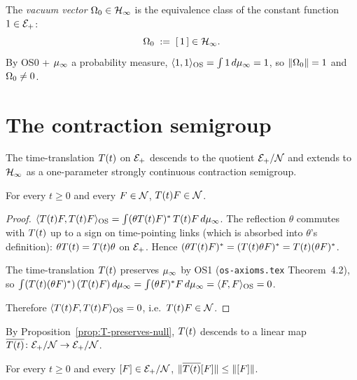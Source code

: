 \begin{definition}
\label{def:vacuum}
The \emph{vacuum vector} $\Omega_0 \in \mathcal{H}_\infty$ is the equivalence
class of the constant function $1 \in \mathcal{E}_+$:
\begin{equation*}
  \Omega_0 \;:=\; [\,1\,] \in \mathcal{H}_\infty.
\end{equation*}
By OS0 + $\mu_\infty$ a probability measure,
$\langle 1, 1 \rangle_{\mathrm{OS}} = \int 1 \, d\mu_\infty = 1$, so $\|\Omega_0\| = 1$ and
$\Omega_0 \ne 0$.
\end{definition}

\section{The contraction semigroup}
\label{sec:semigroup}

The time-translation $T(t)$ on $\mathcal{E}_+$ descends to the quotient
$\mathcal{E}_+ / \mathcal{N}$ and extends to $\mathcal{H}_\infty$ as a one-parameter
strongly continuous contraction semigroup.

\begin{proposition}
\label{prop:T-preserves-null}
For every $t \ge 0$ and every $F \in \mathcal{N}$, $T(t) F \in \mathcal{N}$.
\end{proposition}

\begin{proof}
$\langle T(t) F, T(t) F \rangle_{\mathrm{OS}} = \int (\theta T(t) F)^* \, T(t) F \, d\mu_\infty$.
The reflection $\theta$ commutes with $T(t)$ up to a sign on
time-pointing links (which is absorbed into $\theta$'s definition):
$\theta T(t) = T(t) \theta$ on $\mathcal{E}_+$.  Hence
$(\theta T(t) F)^* = (T(t) \theta F)^* = T(t) (\theta F)^*$.

The time-translation $T(t)$ preserves $\mu_\infty$ by OS1
(\texttt{os-axioms.tex} Theorem~4.2), so
$\int (T(t) (\theta F)^*) \, (T(t) F) \, d\mu_\infty =
 \int (\theta F)^* F \, d\mu_\infty =
 \langle F, F \rangle_{\mathrm{OS}} = 0$.

Therefore $\langle T(t) F, T(t) F \rangle_{\mathrm{OS}} = 0$, i.e.\ $T(t) F \in \mathcal{N}$.
\end{proof}

By Proposition~\ref{prop:T-preserves-null}, $T(t)$ descends to a
linear map $\overline{T(t)} \colon \mathcal{E}_+ / \mathcal{N} \to \mathcal{E}_+ / \mathcal{N}$.

\begin{proposition}
\label{prop:T-contraction}
For every $t \ge 0$ and every $[F] \in \mathcal{E}_+ / \mathcal{N}$,
$\|\overline{T(t)} [F]\| \le \|[F]\|$.
\end{proposition}

